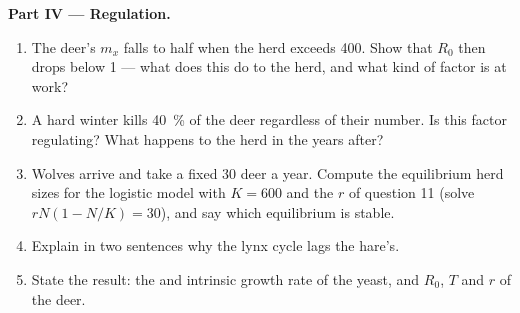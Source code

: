 \begin{problem}
\medskip
\noindent\textbf{Part IV --- Regulation.}
\begin{enumerate}[resume]
  \item The deer's $m_x$ falls to half when the herd exceeds 400. Show
        that $R_0$ then drops below 1 --- what does this do to the
        herd, and what kind of factor is at work?
  \item A hard winter kills \qty{40}{\%} of the deer regardless of
        their number. Is this factor regulating? What happens to the
        herd in the years after?
  \item Wolves arrive and take a fixed 30 deer a year. Compute the
        equilibrium herd sizes for the logistic model with $K = 600$
        and the $r$ of question 11 (solve $rN(1 - N/K) = 30$), and
        say which equilibrium is stable.
  \item Explain in two sentences why the lynx cycle lags the hare's.
  \item State the result: the  and intrinsic growth
        rate of the yeast, and $R_0$, $T$ and $r$ of the deer.
\end{enumerate}
\end{problem}
